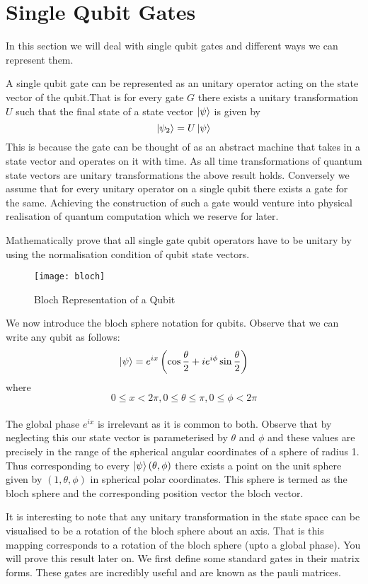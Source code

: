 \chapter{Single Qubit Gates}

In this section we will deal with single qubit gates and different ways we can represent them.

A single qubit gate can be represented as an unitary operator acting on the state vector of the qubit.That is for every gate $G$ there exists a unitary transformation $U$ such that the final state of a state vector $\ket{\psi}$ is given by 
$$ \ket{\psi_2} = U\ket{\psi}$$
This is because the gate can be thought of as an abstract machine that takes in a state vector and operates on it with time. As all time transformations of quantum state vectors are unitary transformations the above result holds. Conversely we assume that for every unitary operator on a single qubit there exists a gate for the same. Achieving the construction of such a gate would venture into physical realisation of quantum computation which we reserve for later.

\begin{exercise}
Mathematically prove that all single gate qubit operators have to be unitary by using the normalisation condition of qubit state vectors.
\end{exercise}
\begin{figure}[htp]
    \centering
    \caption{Bloch Representation of a Qubit}
    \texttt{[image: bloch]}
\end{figure}

We now introduce the bloch sphere notation for qubits. Observe that we can write any qubit as follows:
$$\ket{\psi} = e^{ix}\left(\cos{\frac{\theta}{2}} + ie^{i\phi}\sin{\frac{\theta}{2}}\right)$$ where $$ 0 \leq x < 2\pi,   0 \leq \theta \leq \pi,   0\leq \phi <2\pi$$
\\
The global phase $e^{ix}$ is irrelevant as it is common to both. Observe that by neglecting this our state vector is parameterised by $\theta$ and $\phi$ and these values are precisely in the range of the spherical angular coordinates of a sphere of radius 1. Thus corresponding to every $\ket{\psi}\left(\theta, \phi \right)$ there exists a point on the unit sphere given by $(1, \theta, \phi)$ in spherical polar coordinates.
This sphere is termed as the bloch sphere and the corresponding position vector the bloch vector.

It is interesting to note that any unitary transformation in the state space can be visualised to be a rotation of the bloch sphere about an axis. That is this mapping corresponds to a rotation of the bloch sphere (upto a global phase). You will prove this result later on.
We first define some standard gates in their matrix forms. These gates are incredibly useful and are known as the pauli matrices.

